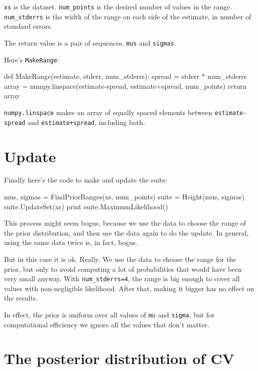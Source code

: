 \documentclass[12pt]{book}
\theoremstyle{exercise}
\begin{document}
{\tt xs} is the dataset.  \verb"num_points" is the desired number of
values in the range.  \verb"num_stderrs" is the width of the range on
each side of the estimate, in number of standard errors.

The return
value is a pair of sequences, {\tt mus} and {\tt sigmas}.

Here's {\tt MakeRange}:

\begin{code}
def MakeRange(estimate, stderr, num_stderrs):
    spread = stderr * num_stderrs
    array = numpy.linspace(estimate-spread,
                           estimate+spread,
                           num_points)
    return array
\end{code}

{\tt numpy.linspace} makes an array of equally spaced elements between
{\tt estimate-spread} and {\tt estimate+spread}, including both.


\section{Update}

Finally here's the code to make and update the suite:

\begin{code}
    mus, sigmas = FindPriorRanges(xs, num_points)
    suite = Height(mus, sigmas)
    suite.UpdateSet(xs)
    print suite.MaximumLikelihood()    
\end{code}

This process might seem bogus, because we use the data to choose the
range of the prior distribution, and then use the data again to do the
update.  In general, using the same data twice is, in fact, bogus.

But in this case it is ok.  Really.  We use the data to choose the
range for the prior, but only to avoid computing a lot of
probabilities that would have been very small anyway.  With
\verb"num_stderrs=4", the range is big enough to cover all values with
non-negligible likelihood.  After that, making it bigger has no effect
on the results.

In effect, the prior is uniform over all values 
of {\tt mu} and {\tt sigma}, but for computational efficiency
we ignore all the values that don't matter.

\section{The posterior distribution of CV}
\end{document}
